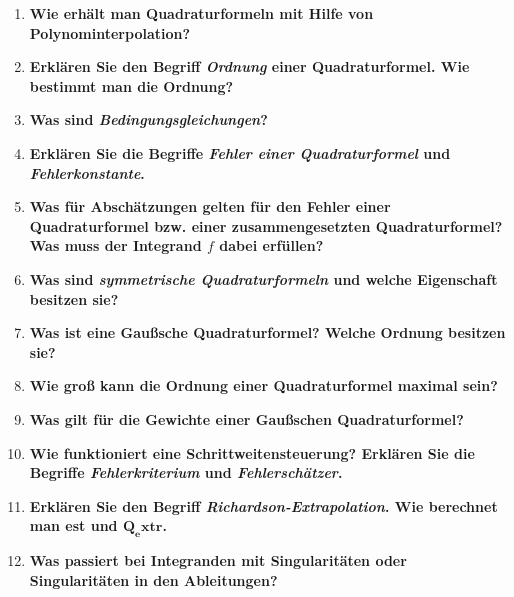 \begin{enumerate}
		\item \textbf{Wie erhält man Quadraturformeln mit Hilfe von Polynominterpolation?} \\
			
		
		\item \textbf{Erklären Sie den Begriff \textit{Ordnung} einer Quadraturformel. Wie bestimmt man die Ordnung?} \\
		
		\item \textbf{Was sind \textit{Bedingungsgleichungen}?} \\
		
		\item \textbf{Erklären Sie die Begriffe \textit{Fehler einer Quadraturformel} und \textit{Fehlerkonstante}.} \\
		
		\item \textbf{Was für Abschätzungen gelten für den Fehler einer Quadraturformel bzw. einer zusammengesetzten Quadraturformel? Was muss der Integrand $f$ dabei erfüllen?} \\
		
		\item \textbf{Was sind \textit{symmetrische Quadraturformeln} und welche Eigenschaft besitzen sie?} \\
		
		\item \textbf{Was ist eine Gaußsche Quadraturformel? Welche Ordnung besitzen sie?} \\
		
		\item \textbf{Wie groß kann die Ordnung einer Quadraturformel maximal sein?} \\
		
		\item \textbf{Was gilt für die Gewichte einer Gaußschen Quadraturformel?} \\
		
		\item \textbf{Wie funktioniert eine Schrittweitensteuerung? Erklären Sie die Begriffe \textit{Fehlerkriterium} und \textit{Fehlerschätzer}.} \\
		
		\item \textbf{Erklären Sie den Begriff \textit{Richardson-Extrapolation}. Wie berechnet man est und $\mathbf{Q_extr}$.} \\
		
		\item \textbf{Was passiert bei Integranden mit Singularitäten oder Singularitäten in den Ableitungen?} \\
		

\end{enumerate}
